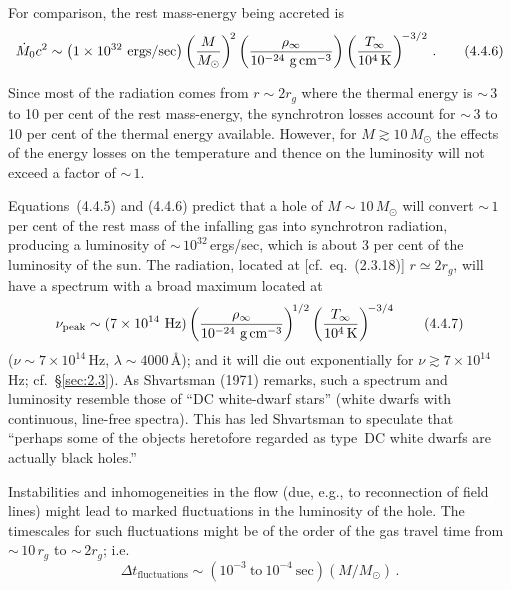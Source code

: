 For comparison, the rest mass-energy being accreted is
%
\begin{equation}
\dot{M}_0 c^2
\sim \bigl(1 \times 10^{32}~\text{ergs}/\text{sec}\bigr)
  \left(\frac{M}{M_\odot}\right)^{\!2}
  \left(\frac{\rho_\infty}{10^{-24}~\text{g\,cm}^{-3}}\right)
  \left(\frac{T_\infty}{10^4\,\text{K}}\right)^{\!-3/2}\,.
\tag{4.4.6}
\end{equation}

Since most of the radiation comes from $r \sim 2r_g$ where the thermal energy is
${\sim}\,3$ to 10 per cent of the rest mass-energy, the synchrotron losses account for
${\sim}\,3$ to 10 per cent of the thermal energy available.  However,
for $M \gtrsim 10\,M_\odot$ the effects of the energy losses on the temperature and thence
on the luminosity will not exceed a factor of ${\sim}\,1$.

Equations~(4.4.5) and (4.4.6) predict that a hole of $M \sim 10\,M_\odot$ will convert
${\sim}\,1$ per cent of the rest mass of the infalling gas into synchrotron radiation,
producing a luminosity of ${\sim}\,10^{32}$\,ergs/sec, which is about 3 per cent of the
luminosity of the sun.  The radiation, located at [cf.\ eq.~(2.3.18)] $r \simeq 2r_g$, will have a spectrum
with a broad maximum located at
%
\begin{equation}
\nu_{\mathrm{peak}}
\sim (7 \times 10^{14}~\text{Hz})
  \left(\frac{\rho_\infty}{10^{-24}~\text{g\,cm}^{-3}}\right)^{\!1/2}
  \left(\frac{T_\infty}{10^4\,\text{K}}\right)^{\!-3/4}
\tag{4.4.7}
\end{equation}
%
($\nu \sim 7 \times 10^{14}$\,Hz, $\lambda \sim 4000$\,\AA); and it will die out exponentially for
$\nu \gtrsim 7 \times 10^{14}$\,Hz; cf.\ \S\ref{sec:2.3}).  As Shvartsman (1971) remarks, such a spectrum
and luminosity resemble those of ``DC white-dwarf stars'' (white dwarfs with
continuous, line-free spectra).  This has led Shvartsman to speculate that
``perhaps some of the objects heretofore regarded as type~DC white dwarfs are
actually black holes.''

Instabilities and inhomogeneities in the flow (due, e.g., to reconnection of
field lines) might lead to marked fluctuations in the luminosity of the hole.  The
timescales for such fluctuations might be of the order of the gas travel time from
${\sim}\,10\,r_g$ to ${\sim}\,2r_g$; i.e.
%
\begin{equation}
\Delta t_{\mathrm{fluctuations}}
\sim (10^{-3}~\text{to}~10^{-4}~\text{sec})(M/M_\odot)\,.
\tag{4.4.8}
\end{equation}

